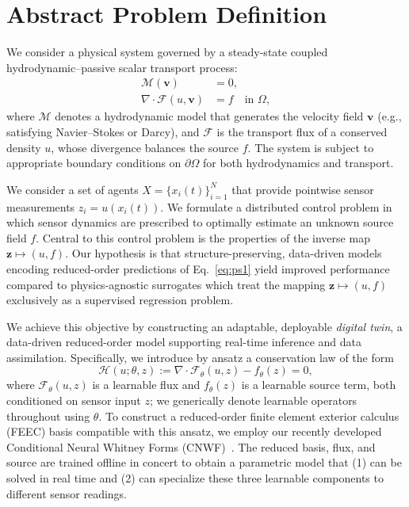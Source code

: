 \documentclass[onefignum,onetabnum]{siamart171218} %
\begin{document}



\section{Abstract Problem Definition}

We consider a physical system governed by a steady-state coupled hydrodynamic–passive scalar transport process:
\begin{align}
    \label{eq:ps1}
    \mathcal{M}(\mathbf{v}) &= 0, \\
    \nabla \cdot \mathcal{F}(u, \mathbf{v}) &= f \quad \text{in } \Omega,
\end{align}
where $\mathcal{M}$ denotes a hydrodynamic model that generates the velocity field $\mathbf{v}$ (e.g., satisfying Navier–Stokes or Darcy), and $\mathcal{F}$ is the transport flux of a conserved density $u$, whose divergence balances the source $f$. The system is subject to appropriate boundary conditions on $\partial\Omega$ for both hydrodynamics and transport. 
 
We consider a set of agents $X = \{x_i(t)\}_{i=1}^N$ that provide pointwise sensor measurements $z_i = u(x_i(t))$. We formulate a distributed control problem in which sensor dynamics are prescribed to optimally estimate an unknown source field $f$. Central to this control problem is the properties of the inverse map $\mathbf{z} \mapsto (u,f)$. Our hypothesis is that structure-preserving, data-driven models encoding reduced-order predictions of Eq.~\eqref{eq:ps1} yield improved performance compared to physics-agnostic surrogates which treat the mapping $\mathbf{z} \mapsto (u,f)$ exclusively as a supervised regression problem.

We achieve this objective by constructing an adaptable, deployable \emph{digital twin}, a data-driven reduced-order model supporting real-time inference and data assimilation. Specifically, we introduce by ansatz a conservation law of the form
\begin{equation}
    \mathcal{H}(u; \theta, z) := \nabla \cdot \mathcal{F}_\theta(u, z) - f_\theta(z) = 0,
\end{equation}
where $\mathcal{F}_\theta(u, z)$ is a learnable flux and $f_\theta(z)$ is a learnable source term, both conditioned on sensor input $z$; we generically denote learnable operators throughout using $\theta$. To construct a reduced-order finite element exterior calculus (FEEC) basis compatible with this ansatz, we employ our recently developed Conditional Neural Whitney Forms (CNWF)~\cite{kinch2025structure}. The reduced basis, flux, and source are trained offline in concert to obtain a parametric model that (1) can be solved in real time and (2) can specialize these three learnable components to different sensor readings.
\end{document}
